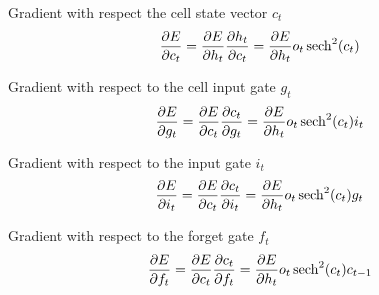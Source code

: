Gradient with respect the cell state vector $c_t$
\newcommand{\pdvEct}{\pdv{E}{h_t} o_t \sech^2 (c_t)}
\begin{equation}
    \pdv{E}{c_t}
    =
    \pdv{E}{h_t}\pdv{h_t}{c_t}
    =
    \pdvEct
\end{equation}

Gradient with respect to the cell input gate $g_t$
\newcommand{\pdvEgt}{\pdvEct i_t}
\begin{equation}
    \pdv{E}{g_t} = \pdv{E}{c_t}\pdv{c_t}{g_t} = \pdvEgt
\end{equation}

Gradient with respect to the input gate $i_t$
\newcommand{\pdvEit}{\pdvEct g_t}
\begin{equation}
    \pdv{E}{i_t} = \pdv{E}{c_t}\pdv{c_t}{i_t} = \pdvEit
\end{equation}

Gradient with respect to the forget gate $f_t$
\newcommand{\pdvEft}{\pdvEct c_{t-1}}
\begin{equation}
    \pdv{E}{f_t} = \pdv{E}{c_t}\pdv{c_t}{f_t} = \pdvEft
\end{equation}

